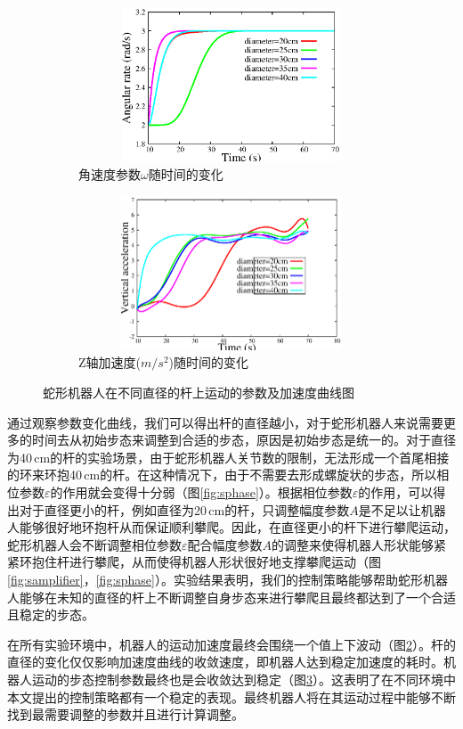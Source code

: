 \begin{figure}[htbp]
\begin{subfigure}{0.45\textwidth}{
			\centering
			\includegraphics[width=1\textwidth,height=130pt]{figure/chap05/sarate.eps}	
			\caption{角速度参数$\omega$随时间的变化}
			\label{fig:sarate}
		}
	\end{subfigure}
	\begin{subfigure}{0.45\textwidth}{
			\centering
			\includegraphics[width=1\textwidth,height=130pt]{figure/chap05/svel.eps}
			\caption{Z轴加速度($m/s^2$)随时间的变化}
			\label{fig:svelocity}
		}
	\end{subfigure}
	\caption{蛇形机器人在不同直径的杆上运动的参数及加速度曲线图}
	\label{fig:scurve}
\end{figure}

通过观察参数变化曲线，我们可以得出杆的直径越小，对于蛇形机器人来说需要更多的时间去从初始步态来调整到合适的步态，原因是初始步态是统一的。对于直径为40\,cm的杆的实验场景，由于蛇形机器人关节数的限制，无法形成一个首尾相接的环来环抱40\,cm的杆。在这种情况下，由于不需要去形成螺旋状的步态，所以相位参数$\varepsilon$的作用就会变得十分弱（图\ref{fig:sphase}）。根据相位参数$\varepsilon$的作用，可以得出对于直径更小的杆，例如直径为20\,cm的杆，只调整幅度参数$A$是不足以让机器人能够很好地环抱杆从而保证顺利攀爬。因此，在直径更小的杆下进行攀爬运动，蛇形机器人会不断调整相位参数$\varepsilon$配合幅度参数$A$的调整来使得机器人形状能够紧紧环抱住杆进行攀爬，从而使得机器人形状很好地支撑攀爬运动（图\ref{fig:samplifier}，\ref{fig:sphase}）。实验结果表明，我们的控制策略能够帮助蛇形机器人能够在未知的直径的杆上不断调整自身步态来进行攀爬且最终都达到了一个合适且稳定的步态。

在所有实验环境中，机器人的运动加速度最终会围绕一个值上下波动（图\ref{fig:svelocity}）。杆的直径的变化仅仅影响加速度曲线的收敛速度，即机器人达到稳定加速度的耗时。机器人运动的步态控制参数最终也是会收敛达到稳定（图\ref{fig:scurve}）。这表明了在不同环境中本文提出的控制策略都有一个稳定的表现。最终机器人将在其运动过程中能够不断找到最需要调整的参数并且进行计算调整。



